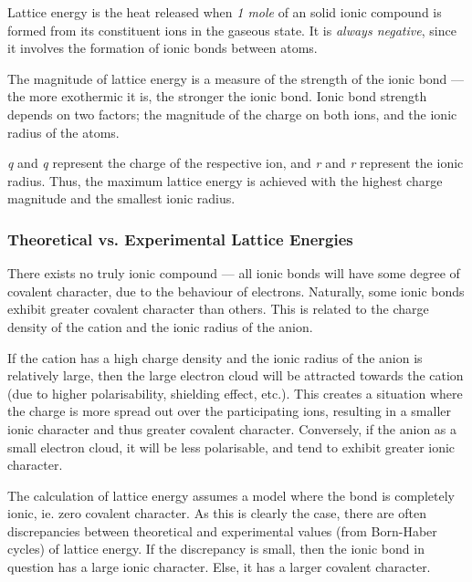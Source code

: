 			Lattice energy is the heat released when \emph{1 mole} of an solid ionic compound is formed from its constituent ions in the
			gaseous state. It is \emph{always negative}, since it involves the formation of ionic bonds between atoms.

			The magnitude of lattice energy is a measure of the strength of the ionic bond — the more exothermic it is, the stronger the ionic bond.
			Ionic bond strength depends on two factors; the magnitude of the charge on both ions, and the ionic radius of the atoms.


			\emph{q\sbs{+}} and \emph{q\sbs{-}} represent the charge of the respective ion, and \emph{r\sbs{+}} and \emph{r\sbs{-}} represent
			the ionic radius. Thus, the maximum lattice energy is achieved with the highest charge magnitude and the smallest ionic radius.


			\subsubsection{Theoretical vs. Experimental Lattice Energies}

				There exists no truly ionic compound --- all ionic bonds will have some degree of covalent character, due to the behaviour of
				electrons. Naturally, some ionic bonds exhibit greater covalent character than others. This is related to the charge density
				of the cation and the ionic radius of the anion.

				If the cation has a high charge density and the ionic radius of the anion is relatively large, then the large electron cloud
				will be attracted towards the cation (due to higher polarisability, shielding effect, etc.). This creates a situation where the
				charge is more spread out over the participating ions, resulting in a smaller ionic character and thus greater covalent
				character. Conversely, if the anion as a small electron cloud, it will be less polarisable, and tend to exhibit greater ionic
				character.

				The calculation of lattice energy assumes a model where the bond is completely ionic, ie. zero covalent character. As this is
				clearly  the case, there are often discrepancies between theoretical and experimental values (from Born-Haber cycles)
				of lattice energy. If the discrepancy is small, then the ionic bond in question has a large ionic character. Else, it has a
				larger covalent character.

